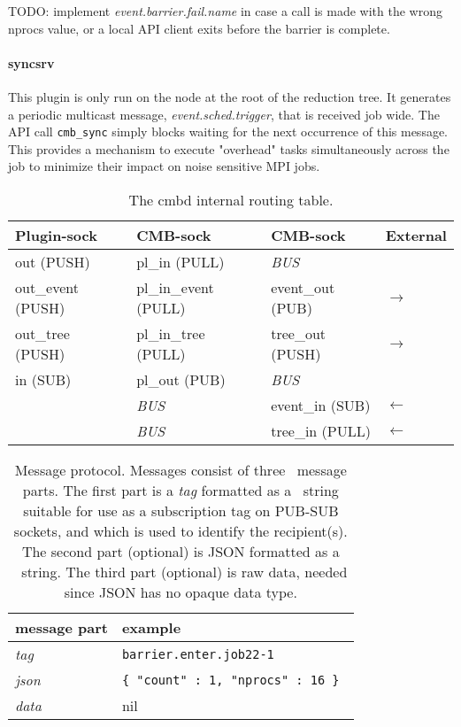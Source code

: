 TODO: implement {\em event.barrier.fail.name} in case a call is made with
the wrong nprocs value, or a local API client exits before the barrier is
complete.

\paragraph{syncsrv}
This plugin is only run on the node at the root of the reduction tree.
It generates a periodic multicast message, {\em event.sched.trigger},
that is received job wide.  The API call {\tt cmb\_sync} simply blocks waiting
for the next occurrence of this message.  This provides a mechanism to execute
"overhead" tasks simultaneously across the job to minimize their impact on
noise sensitive MPI jobs.

\begin{table}
\centering
\begin{tabular}{|l|l|l|l|}\hline
\textbf{Plugin-sock} & \textbf{CMB-sock} & \textbf{CMB-sock}
					 & \textbf{External} \\
\hline
out (PUSH)		& pl\_in (PULL)	& {\em BUS} & \\
out\_event (PUSH)  & pl\_in\_event (PULL) & event\_out (PUB) & $\rightarrow$ \\
out\_tree (PUSH) & pl\_in\_tree	(PULL) & tree\_out (PUSH) & $\rightarrow$ \\
in (SUB)	& pl\_out (PUB)	& {\em BUS}     & \\
\hline
		& {\em BUS}	& event\_in (SUB) & $\leftarrow$ \\
		& {\em BUS}	& tree\_in (PULL) & $\leftarrow$ \\
\hline
\end{tabular}
\caption{The cmbd internal routing table.}
\label{tab:cmbrouting}
\end{table}

\begin{table}
\centering
\begin{tabular}{|l|p{6cm}|}\hline
\textbf{message part} & \textbf{example} \\
\hline
{\em tag} & {\tt barrier.enter.job22-1} \\
\hline
{\em json} & {\tt \{ "count" : 1, "nprocs" : 16 \} }\\
\hline
{\em data} & nil\\
\hline
\end{tabular}
\caption{Message protocol.  Messages consist of three \zMQ\ message parts.
The first part is a {\em tag} formatted as a \zMQ\ string suitable for
use as a subscription tag on PUB-SUB sockets, and which is used to identify
the recipient(s).
The second part (optional) is JSON formatted as a \zMQ\ string.
The third part (optional) is raw data, needed since JSON has no opaque
data type.}
\label{tab:cmbproto}
\end{table}


